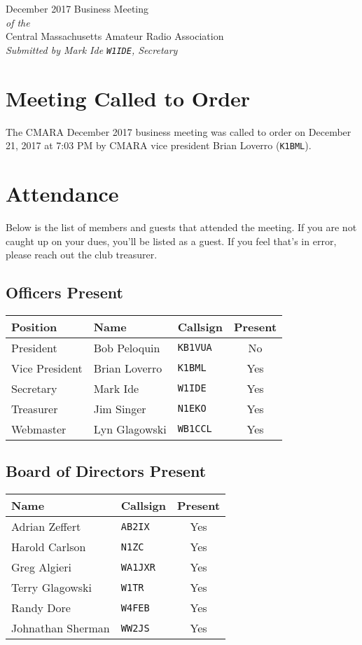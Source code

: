 \documentclass[10pt,letterpaper]{article}
\begin{document}
\begin{center}
{\huge December 2017 Business Meeting}\\
\emph{of the}\\
{\Large Central Massachusetts Amateur Radio Association}\\
\emph{Submitted by Mark Ide \texttt{W1IDE}, Secretary}
\end{center}

\section{Meeting Called to Order}
The CMARA December 2017 business meeting was called to order on December 21, 2017 at 7:03 PM by CMARA vice president Brian Loverro (\texttt{K1BML}).

\section{Attendance}
\noindent
Below is the list of members and guests that attended the meeting. If you are not caught up on your dues, you'll be listed as a guest. If you feel that's in error, please reach out the club treasurer.

\subsection{Officers Present}
\begin{tabular}{|l|l|l|c|}
  \hline
  \textbf{Position} & \textbf{Name}  & \textbf{Callsign} & \textbf{Present} \\ \hline
  President         & Bob Peloquin   & \texttt{KB1VUA}   & No  \\
  Vice President    & Brian Loverro  & \texttt{K1BML}    & Yes \\
  Secretary         & Mark Ide       & \texttt{W1IDE}    & Yes \\
  Treasurer         & Jim Singer     & \texttt{N1EKO}    & Yes \\
  Webmaster         & Lyn Glagowski  & \texttt{WB1CCL}   & Yes \\
  \hline
\end{tabular}

\subsection{Board of Directors Present}
\begin{tabular}{|l|l|c|}
  \hline
  \textbf{Name}     & \textbf{Callsign} & \textbf{Present} \\ \hline
  Adrian Zeffert    & \texttt{AB2IX}    & Yes \\
  Harold Carlson    & \texttt{N1ZC}     & Yes \\
  Greg Algieri      & \texttt{WA1JXR}   & Yes \\
  Terry Glagowski   & \texttt{W1TR}     & Yes \\
  Randy Dore        & \texttt{W4FEB}    & Yes \\
  Johnathan Sherman & \texttt{WW2JS}    & Yes \\
  \hline
\end{tabular}
\end{document}
